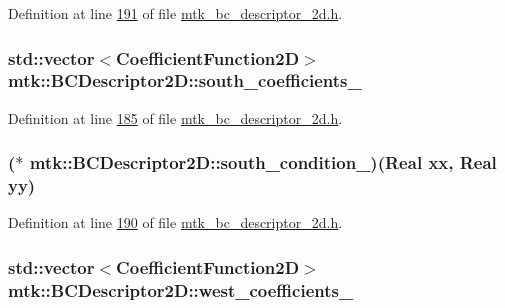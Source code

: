 Definition at line \hyperlink{mtk__bc__descriptor__2d_8h_source_l00191}{191} of file \hyperlink{mtk__bc__descriptor__2d_8h_source}{mtk\+\_\+bc\+\_\+descriptor\+\_\+2d.\+h}.

\hypertarget{classmtk_1_1BCDescriptor2D_a263309b9ad288dc89826d818d9378d07}{
\subsubsection[{south\+\_\+coefficients\+\_\+}]{\setlength{\rightskip}{0pt plus 5cm}std\+::vector$<${\bf Coefficient\+Function2\+D}$>$ mtk\+::\+B\+C\+Descriptor2\+D\+::south\+\_\+coefficients\+\_\+\hspace{0.3cm}{\ttfamily [private]}}}\label{classmtk_1_1BCDescriptor2D_a263309b9ad288dc89826d818d9378d07}


Definition at line \hyperlink{mtk__bc__descriptor__2d_8h_source_l00185}{185} of file \hyperlink{mtk__bc__descriptor__2d_8h_source}{mtk\+\_\+bc\+\_\+descriptor\+\_\+2d.\+h}.

\hypertarget{classmtk_1_1BCDescriptor2D_ae4e7cdb5e7007c5ab09b6c0efb329943}{
\subsubsection[{south\+\_\+condition\+\_\+}]{($\ast$ mtk\+::\+B\+C\+Descriptor2\+D\+::south\+\_\+condition\+\_\+)({\bf Real} xx, {\bf Real} yy)\hspace{0.3cm}{\ttfamily [private]}}}\label{classmtk_1_1BCDescriptor2D_ae4e7cdb5e7007c5ab09b6c0efb329943}


Definition at line \hyperlink{mtk__bc__descriptor__2d_8h_source_l00190}{190} of file \hyperlink{mtk__bc__descriptor__2d_8h_source}{mtk\+\_\+bc\+\_\+descriptor\+\_\+2d.\+h}.

\hypertarget{classmtk_1_1BCDescriptor2D_a7df71b43acc25c468683075cc7790bb2}{
\subsubsection[{west\+\_\+coefficients\+\_\+}]{\setlength{\rightskip}{0pt plus 5cm}std\+::vector$<${\bf Coefficient\+Function2\+D}$>$ mtk\+::\+B\+C\+Descriptor2\+D\+::west\+\_\+coefficients\+\_\+\hspace{0.3cm}{\ttfamily [private]}}}\label{classmtk_1_1BCDescriptor2D_a7df71b43acc25c468683075cc7790bb2}


